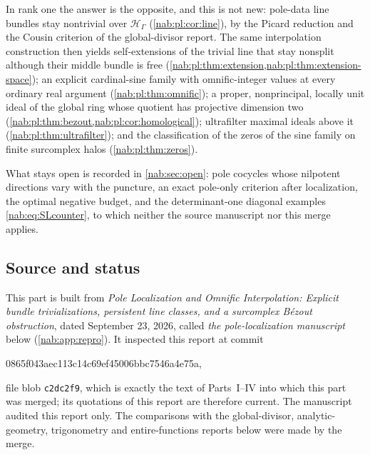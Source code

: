 \documentclass[11pt,letterpaper]{article}
\theoremstyle{definition}
\theoremstyle{remark}
\newcommand{\HH}{\mathscr H_\Gamma}
\numberwithin{equation}{section}
\begin{document}
In rank one the answer is the opposite, and this is not new: pole-data line
bundles stay nontrivial over $\HH$ (\cref{nab:pl:cor:line}), by the Picard
reduction and the Cousin criterion of the global-divisor report. The same
interpolation construction then yields self-extensions of the trivial line
that stay nonsplit although their middle bundle is free
(\cref{nab:pl:thm:extension,nab:pl:thm:extension-space}); an explicit
cardinal-sine family with omnific-integer values at every ordinary real
argument (\cref{nab:pl:thm:omnific}); a proper, nonprincipal, locally unit
ideal of the global ring whose quotient has projective dimension two
(\cref{nab:pl:thm:bezout,nab:pl:cor:homological}); ultrafilter maximal
ideals above it (\cref{nab:pl:thm:ultrafilter}); and the classification of the
zeros of the sine family on finite surcomplex halos
(\cref{nab:pl:thm:zeros}).

What stays open is recorded in \cref{nab:sec:open}: pole cocycles whose
nilpotent directions vary with the puncture, an exact pole-only criterion after
localization, the optimal negative budget, and the determinant-one diagonal
examples \eqref{nab:eq:SLcounter}, to which neither the source manuscript nor
this merge applies.

\subsection{Source and status}\label{nab:pl:sub:status}

This part is built from \emph{Pole Localization and Omnific Interpolation:
Explicit bundle trivializations, persistent line classes, and a surcomplex
B\'ezout obstruction}, dated September 23, 2026, called \emph{the
pole-localization manuscript} below (\cref{nab:app:repro}). It inspected this
report at commit
\begin{center}\small\ttfamily
0865f043aec113c14c69ef45006bbc7546a4e75a,
\end{center}
file blob \texttt{c2dc2f9}, which is exactly the text of Parts~I--IV into which
this part was merged; its quotations of this report are therefore current.
The manuscript audited this report only. The comparisons with the
global-divisor, analytic-geometry, trigonometry and entire-functions reports
below were made by the merge.
\end{document}
